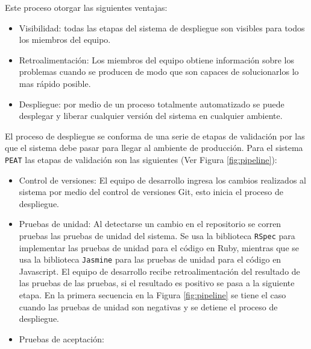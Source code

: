 Este proceso otorgar las siguientes ventajas:
\begin{itemize}
\item Visibilidad: todas las etapas del sistema de despliegue son visibles
  para todos los miembros del equipo.
\item Retroalimentación: Los miembros del equipo obtiene información sobre los
  problemas cuando se producen de modo que son capaces de solucionarlos lo mas
  rápido posible.
\item Despliegue: por medio de un proceso totalmente automatizado se puede
  desplegar y liberar cualquier versión del sistema en cualquier ambiente.
\end{itemize}

El proceso de despliegue se conforma de una serie de etapas de validación por las
que el sistema debe pasar para llegar al ambiente de producción. Para el sistema
\texttt{PEAT} las etapas de validación son las siguientes (Ver Figura
\ref{fig:pipeline}):
\begin{itemize}
\item Control de versiones: El equipo de desarrollo ingresa los cambios
  realizados al sistema por medio del control de versiones Git, esto inicia
  el proceso de despliegue.
\item Pruebas de unidad: Al detectarse un cambio en el repositorio se corren
  pruebas las pruebas de unidad del sistema. Se usa la biblioteca \texttt{RSpec}
  para implementar las pruebas de unidad para el código en Ruby, mientras que se
  usa la biblioteca \texttt{Jasmine} para las pruebas de unidad para el código en
  Javascript. El equipo de desarrollo recibe retroalimentación del resultado de
  las pruebas de las pruebas, si el resultado es positivo se pasa a la siguiente
  etapa. En la primera secuencia en la Figura \ref{fig:pipeline} se tiene el caso
  cuando las pruebas de unidad son negativas y se detiene el proceso de despliegue.
\item Pruebas de aceptación:
\end{itemize}






